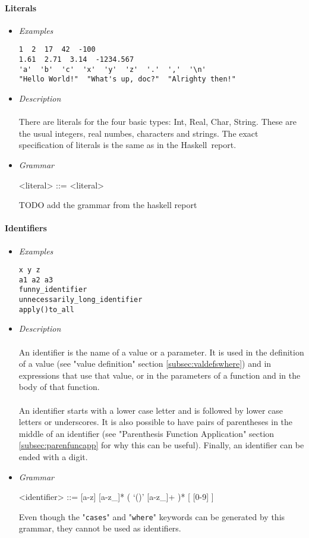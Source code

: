 \documentclass{article}
\def\H{Haskell}
\begin{document}
\paragraph{Literals}
\begin{itemize}

\item \textit{Examples}
\begin{verbatim}
1  2  17  42  -100
1.61  2.71  3.14  -1234.567
'a'  'b'  'c'  'x'  'y'  'z'  '.'  ','  '\n'
"Hello World!"  "What's up, doc?"  "Alrighty then!"
\end{verbatim}

\item \textit{Description} \\\\
There are literals for the four basic types: Int, Real, Char, String. These are the 
usual integers, real numbes, characters and strings. The exact specification of 
literals is the same as in the \H\ report.

\item \textit{Grammar}
\begin{grammar}
<literal> ::= <literal>
\end{grammar}
TODO add the grammar from the haskell report

\end{itemize}


\paragraph{Identifiers}
\begin{itemize}

\item \textit{Examples}
\begin{verbatim}
x y z
a1 a2 a3 
funny_identifier 
unnecessarily_long_identifier
apply()to_all
\end{verbatim}

\item \textit{Description} \\\\
An identifier is the name of a value or a parameter. It is used in the
definition of a value (see "value definition" section
\ref{subsec:valdefswhere}) and in expressions that use that value, or in the
parameters of a function and in the body of that function.
\\\\
An identifier starts with a lower case letter and is followed by lower case
letters or underscores. It is also possible to have pairs of parentheses in the
middle of an identifier (see "Parenthesis Function Application" section
\ref{subsec:parenfuncapp} for why this can be useful).  Finally, an identifier
can be ended with a digit.

\item \textit{Grammar}
\begin{grammar}
<identifier> ::= [a-z] [a-z_]* ( `()' [a-z_]+ )* [ [0-9] ]
\end{grammar}
Even though the "\texttt{cases}" and "\texttt{where}" keywords can be generated
by this grammar, they cannot be used as identifiers.

\end{itemize}
\end{document}
